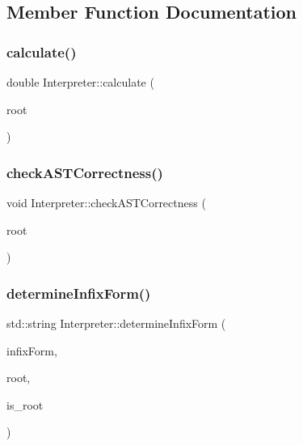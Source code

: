 \subsection{Member Function Documentation}
\mbox{\label{class_interpreter_aafb0a178fc895f9b2c718da4cd2f0c53}} 
\subsubsection{\texorpdfstring{calculate()}{calculate()}}
{\footnotesize\ttfamily double Interpreter\+::calculate (\begin{DoxyParamCaption}\item[{std\+::unique\+\_\+ptr$<$ \mbox{\hyperlink{class_abstract_expression}{Abstract\+Expression}} $>$ \&}]{root }\end{DoxyParamCaption})}

\mbox{\label{class_interpreter_ab8272fcb4cdd34516054165aabe3a2de}} 
\subsubsection{\texorpdfstring{checkASTCorrectness()}{checkASTCorrectness()}}
{\footnotesize\ttfamily void Interpreter\+::check\+A\+S\+T\+Correctness (\begin{DoxyParamCaption}\item[{std\+::unique\+\_\+ptr$<$ \mbox{\hyperlink{class_abstract_expression}{Abstract\+Expression}} $>$ \&}]{root }\end{DoxyParamCaption})}

\mbox{\label{class_interpreter_a7ee7897d2775284b4dcd9ba74cdb4688}} 
\subsubsection{\texorpdfstring{determineInfixForm()}{determineInfixForm()}}
{\footnotesize\ttfamily std\+::string Interpreter\+::determine\+Infix\+Form (\begin{DoxyParamCaption}\item[{std\+::string \&}]{infix\+Form,  }\item[{std\+::unique\+\_\+ptr$<$ \mbox{\hyperlink{class_abstract_expression}{Abstract\+Expression}} $>$ \&}]{root,  }\item[{bool}]{is\+\_\+root }\end{DoxyParamCaption})}

